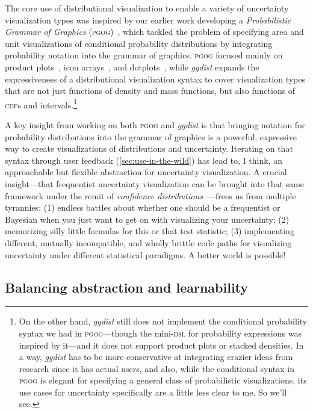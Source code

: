 \documentclass[journal]{vgtc}                     %
\begin{document}
The core use of distributional visualization to enable a variety of uncertainty visualization types was inspired by our earlier work developing a \textit{Probabilistic Grammar of Graphics} (\textsc{pgog})~\cite{pu2020probabilistic}, which tackled the problem of specifying area and unit visualizations of conditional probability distributions by integrating probability notation into the grammar of graphics. \textsc{pgog} focused mainly on product plots~\cite{wickham2011product}, icon arrays~\cite{ancker2006design}, and dotplots~\cite{wilkinson1999dot}, while \textit{ggdist} expands the expressiveness of a distributional visualization syntax to cover visualization types that are not just functions of density and mass functions, but also functions of \textsc{cdf}s and intervals.\footnote{On the other hand, \textit{ggdist} still does not implement the conditional probability syntax we had in \textsc{pgog}---though the mini-\textsc{dsl} for probability expressions was inspired by it---and it does not support product plots or stacked densities. In a way, \textit{ggdist} has to be more conservative at integrating crazier ideas from research since it has actual users, and also, while the conditional syntax in \textsc{pgog} is elegant for specifying a general class of probabilistic visualizations, its use cases for uncertainty specifically are a little less clear to me. So we'll see.} 

A key insight from working on both \textsc{pgog} and \textit{ggdist} is that bringing notation for probability distributions into the grammar of graphics is a powerful, expressive way to create visualizations of distributions and uncertainty. Iterating on that syntax through user feedback 
(\cref{sec:use-in-the-wild}) has lead to, I think, an approachable but flexible abstraction for uncertainty visualization. A crucial insight---that frequentist uncertainty visualization can be brought into that same framework under the remit of \textit{confidence distributions}~\cite{xie2013confidence}---frees us from multiple tyrannies: (1) endless battles about whether one should be a frequentist or Bayesian when you just want to get on with visualizing your uncertainty; (2) memorizing silly little formulas
for this or that test statistic; (3) implementing different, mutually incompatible, and wholly brittle code paths for visualizing uncertainty under different statistical paradigms. A better world is possible!

\subsection{Balancing abstraction and learnability}
\end{document}
